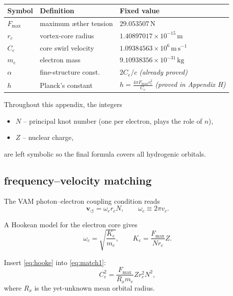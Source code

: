 \documentclass[a4paper,12pt]{article}
\begin{document}
\begin{table}[h]
    \centering
    \begin{tabular}{lll}
        \toprule
        \textbf{Symbol} & \textbf{Definition} & \textbf{Fixed value} \\
        \midrule
        $F_{\max}$ & maximum æther tension & $29.053507\,\text{N}$ \\
        $r_c$ & vortex-core radius & $1.40897017\times10^{-15}\,\text{m}$ \\
        $C_e$ & core swirl velocity & $1.09384563\times10^{6}\,\text{m}\,\text{s}^{-1}$ \\
        $m_e$ & electron mass & $9.10938356\times10^{-31}\,\text{kg}$ \\
        $\alpha$ & fine-structure const. & $2C_e/c$ \textit{(already proved)} \\
        $h$ & Planck’s constant & $\displaystyle h=\frac{4\pi F_{\max}r_c^{2}}{C_e}$ \textit{(proved in Appendix H)} \\
        \bottomrule
    \end{tabular}
    \caption{}
    \label{tab:primitives}
\end{table}

Throughout this appendix, the integers
\begin{itemize}
    \item $N$ -- principal knot number (one per electron, plays the role of $n$),
    \item $Z$ -- nuclear charge,
\end{itemize}
are left symbolic so the final formula covers all hydrogenic orbitals.

\subsection{frequency--velocity matching}

The VAM photon--electron coupling condition reads
\begin{equation}
    \mathbf{v}_{\scriptscriptstyle\boldsymbol{\circlearrowleft}} = \omega_c r_c N, \qquad \omega_c \equiv 2\pi v_c.
\label{eq:match1}
\end{equation}

A Hookean model for the electron core gives
\begin{equation}
    \omega_c = \sqrt{\frac{K_e}{m_e}}, \qquad
    K_e = \frac{F_{\max}}{N r_c} Z.
\label{eq:hooke}
\end{equation}

Insert \eqref{eq:hooke} into \eqref{eq:match1}:
\begin{equation}
    C_e^2 = \frac{F_{\max}}{R_x m_e} Z r_c^{2} N^{2},
\label{eq:master}
\end{equation}
where $R_x$ is the yet-unknown mean orbital radius.
\end{document}
